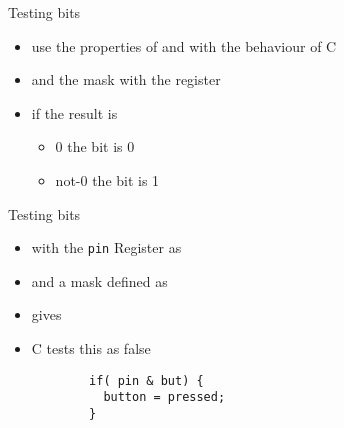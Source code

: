 \documentclass[svgnames,x11names]{beamer}
\begin{document}
\begin{frame}[fragile]{Testing bits}
  \begin{itemize}
  \item use the properties of \alert{and} with the behaviour of C
  \item \alert{and} the \alert{mask} with the register
    \begin{minipage}{0.8\linewidth}
      \begin{block}{}
      \end{block}
    \end{minipage}
  \item if the result is
    \begin{itemize}
    \item 0 the bit is 0
    \item not-0 the bit is 1
    \end{itemize}

  \end{itemize}
\end{frame}

\begin{frame}[fragile]{Testing bits}
\begin{example}
    \begin{itemize}
    \item with the \texttt{pin}  
    Register as
    \item and a mask defined as
      \begin{minipage}{0.8\linewidth}
        \begin{block}{}
        \end{block}
      \end{minipage}
      \begin{minipage}{0.8\linewidth}
        \begin{block}{}
        \end{block}
      \end{minipage}
\item      gives 
    \item C tests this as false
      \begin{minipage}{0.8\linewidth}
        \begin{block}{}
\begin{verbatim}
        if( pin & but) {
          button = pressed;
        }
\end{verbatim}
        \end{block}
      \end{minipage}
    \end{itemize}
  \end{example}
\end{frame}
\end{document}

